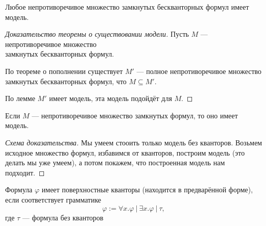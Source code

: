 \addtocounter{theorem}{-1}

\begin{theorem}
    Любое непротиворечивое множество замкнутых бескванторных формул имеет модель.
\end{theorem}

\begin{proof}[Доказательство теоремы о существовании модели]
Пусть $M$ --- непротиворечивое множество\\ замкнутых бескванторных формул.

По теореме о пополнении существует $M'$ --- полное непротиворечивое множество замкнутых бескванторных формул,
что $M \subseteq M'$.

По лемме $M'$ имеет модель, эта модель подойдёт для $M$.
\end{proof}

\begin{theorem}
Если $M$ --- непротиворечивое множество замкнутых формул, то оно имеет модель.
\end{theorem}
\begin{proof}[Схема доказательства] Мы умеем стооить только модель без кванторов. Возьмем исходное множество формул, избавимся от кванторов, построим модель (это делать мы уже умеем), а потом покажем, что построенная модель нам подходит.

\end{proof}

\begin{definition}
    Формула $\varphi$ имеет поверхностные кванторы (находится в предварённой форме), если
соответствует грамматике
\[\varphi := \forall x.\varphi\ |\ \exists x.\varphi\ |\ \tau, \]
где $\tau$ --- формула без кванторов
\end{definition}

